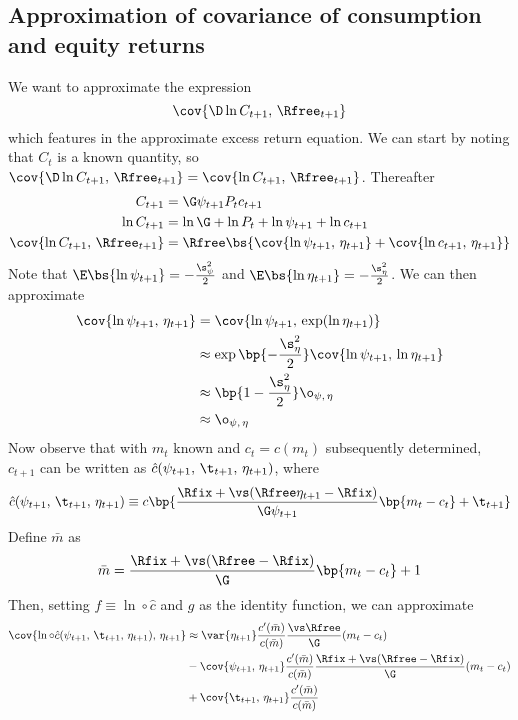 \subsection{Approximation of covariance of consumption and equity returns}\label{app:cons_return_cov}

We want to approximate the expression
\[
\cov{\D\ln C_{t+1},\,\Rfree_{t+1}}
\]
which features in the approximate excess return equation. We can start by noting that $C_t$ is a known quantity, so $\cov{\D\ln C_{t+1},\,\Rfree_{t+1}} = \cov{\ln C_{t+1},\,\Rfree_{t+1}}$. Thereafter
\begin{align*}
    C_{t+1} &= \G\psi_{t+1}P_tc_{t+1}\\
    \ln C_{t+1} &= \ln \G + \ln P_t + \ln \psi_{t+1}+ \ln c_{t+1}\\
    \cov{\ln C_{t+1},\,\Rfree_{t+1}} &= \Rfree\bs{\cov{\ln \psi_{t+1},\,\eta_{t+1}} + \cov{\ln c_{t+1},\,\eta_{t+1}}}
\end{align*}
Note that $\E\bs{\ln \psi_{t+1}} = -\frac{\s_{\psi}^2}{2}$ and $\E\bs{\ln \eta_{t+1}} = -\frac{\s_{\eta}^2}{2}$. We can then approximate
\begin{align*}
    \cov{\ln \psi_{t+1},\,\eta_{t+1}} &= \cov{\ln \psi_{t+1},\,\exp(\ln \eta_{t+1})}\\
    &\approx \exp\bp{-\frac{\s_{\eta}^2}{2}}\cov{\ln \psi_{t+1},\,\ln \eta_{t+1}}\\
    &\approx \bp{1 - \frac{\s_{\eta}^2}{2}}\o_{\psi,\,\eta}\\
    &\approx \o_{\psi,\,\eta}
\end{align*}
Now observe that with $m_t$ known and $c_t = c(m_t)$ subsequently determined, $c_{t+1}$ can be written as $\hat{c}(\psi_{t+1},\,\t_{t+1},\,\eta_{t+1})$, where
\[
\hat{c}(\psi_{t+1},\,\t_{t+1},\,\eta_{t+1}) \equiv c\bp{\frac{\Rfix + \vs(\Rfree\eta_{t+1} - \Rfix)}{\G\psi_{t+1}}\bp{m_t - c_t} + \t_{t+1}}
\]
Define $\bar{m}$ as
\[
\bar{m} = \frac{\Rfix + \vs(\Rfree - \Rfix)}{\G}\bp{m_t - c_t} + 1
\]
Then, setting $f \equiv \ln \circ \hat{c}$ and $g$ as the identity function, we can approximate
\begin{align*}
    \cov{\ln \circ \hat{c}(\psi_{t+1},\,\t_{t+1},\,\eta_{t+1}),\,\eta_{t+1}} & \approx \var{\eta_{t+1}} \frac{c'(\bar{m})}{c(\bar{m})}\frac{\vs\Rfree}{\G}(m_t - c_t)\\
    &- \cov{\psi_{t+1},\,\eta_{t+1}}\frac{c'(\bar{m})}{c(\bar{m})}\frac{\Rfix + \vs(\Rfree - \Rfix)}{\G}(m_t - c_t)\\
    &+ \cov{\t_{t+1},\,\eta_{t+1}}\frac{c'(\bar{m})}{c(\bar{m})}
\end{align*}
